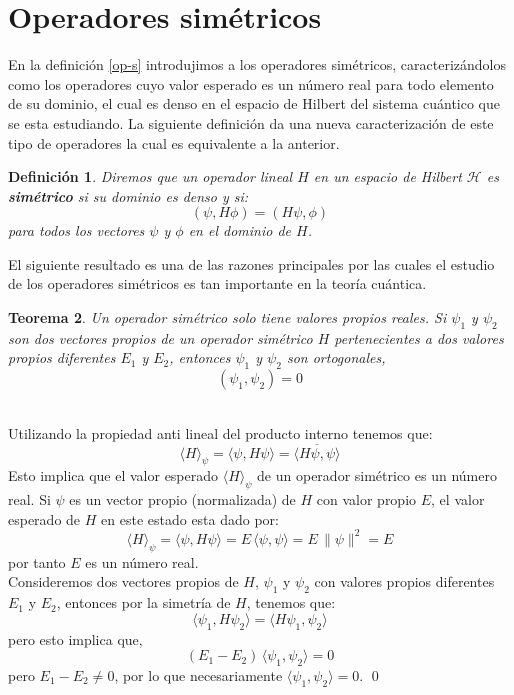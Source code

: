 \documentclass[12pt]{book}
\numberwithin{equation}{chapter}
\newtheorem{theorem}{Teorema}[chapter]
\newtheorem{definition}[theorem]{Definici\'on}
\def\n{\noindent}
\def\ol{\overline}
\def\la{\langle}
\def\ra{\rangle}
\def\H{\mathcal{H}}
\begin{document}
\section{Operadores sim\'etricos}
En la definici\'on \ref{op-s} introdujimos a los operadores sim\'etricos, caracteriz\'andolos como los operadores cuyo valor esperado es un n\'umero real para todo elemento de su dominio, el cual es denso en el espacio de Hilbert del sistema cu\'antico que se esta estudiando. La siguiente definici\'on da una nueva caracterizaci\'on de este tipo de operadores la cual es equivalente a la anterior.

\begin{definition}
Diremos que un operador lineal $H$ en un espacio de Hilbert $\H$ es {\bf sim\'etrico} si su dominio es denso y si:
\begin{equation}
( \psi , H\phi )= (H\psi , \phi )
\end{equation}
para todos los vectores $\psi$ y $\phi$ en el dominio de $H$.
\end{definition}

El siguiente resultado es una de las razones principales por las cuales el estudio de los operadores sim\'etricos es tan importante en la teor\'ia cu\'antica.

\begin{theorem}
Un operador sim\'etrico solo tiene valores propios reales. Si $\psi_{1}$ y $\psi_{2}$ son dos vectores propios de un operador sim\'etrico $H$ pertenecientes a dos valores propios diferentes $E_{1}$ y $E_{2}$, entonces $\psi_{1}$ y $\psi_{2}$ son ortogonales,
\begin{equation}
( \psi_{1},\psi_{2} )=0
\end{equation}
\end{theorem}
\n {\bf Demostraci\'on}\\
Utilizando la propiedad anti lineal del producto interno tenemos que:
\begin{equation}
\la H \ra_{\psi} = \la \psi , H\psi \ra = \ol{ \la H\psi,\psi \ra }
\end{equation}
Esto implica que el valor esperado $\la H \ra_{\psi}$ de un operador sim\'etrico es un n\'umero real. Si $\psi$ es un vector propio (normalizada) de $H$ con valor propio $E$, el valor esperado de $H$ en este estado esta dado por:
\begin{equation}
\la H \ra_{\psi} = \la \psi,H\psi \ra = E\, \la \psi,\psi \ra = E\, \| \psi \|^{2}= E  
\end{equation}
por tanto $E$ es un n\'umero real.\\
Consideremos dos vectores propios de $H$, $\psi_{1}$ y $\psi_{2}$ con valores propios diferentes $E_{1}$ y $E_{2}$, entonces por la simetr\'ia de $H$, tenemos que:
\begin{equation}
\la \psi_{1},H\psi_{2} \ra =  \la H\psi_{1},\psi_{2} \ra
\end{equation}
pero esto implica que,
\begin{equation}
( E_{1}-E_{2} )\, \la \psi_{1},\psi_{2} \ra=0
\end{equation}
pero $E_{1}-E_{2} \neq 0$, por lo que necesariamente $\la \psi_{1},\psi_{2} \ra=0$. \qed
\end{document}
